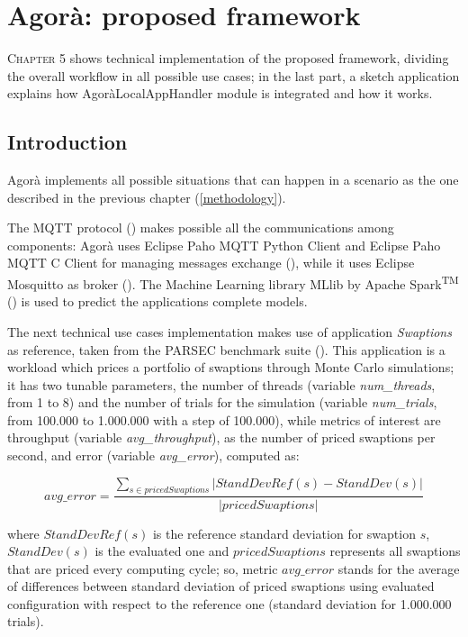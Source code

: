 \chapter{Agorà: proposed framework}\label{agora}

\lettrine{C}{hapter} 5 shows technical implementation of the proposed framework, dividing the overall workflow in all possible use cases; in the last part, a sketch application explains how AgoràLocalAppHandler module is integrated and how it works.


\section{Introduction}

Agorà implements all possible situations that can happen in a scenario as the one described in the previous chapter (\ref{methodology}).

The MQTT protocol (\cite{banks2014mqtt}) makes possible all the communications among components: Agorà uses Eclipse Paho MQTT Python Client and Eclipse Paho MQTT C Client for managing messages exchange (\cite{o2014paho}), while it uses Eclipse Mos\-quitto as broker (\cite{light2013mosquitto}). The Machine Learning library MLlib by Apache Spark\textsuperscript{TM} (\cite{spark2015apache}) is used to predict the applications complete models.

The next technical use cases implementation makes use of application \textit{Swaptions} as reference, taken from the PARSEC benchmark suite (\cite{bienia2008parsec}). This application is a workload which prices a portfolio of swaptions through Monte Carlo simulations; it has two tunable parameters, the number of threads (variable \textit{num\_threads}, from 1 to 8) and the number of trials for the simulation (variable \textit{num\_trials}, from 100.000 to 1.000.000 with a step of 100.000), while metrics of interest are throughput (variable \textit{avg\_throughput}), as the number of priced swaptions per second, and error (variable \textit{avg\_error}), computed as:

\[
avg\_error = \dfrac{\sum_{s \in pricedSwaptions} \left\vert StandDevRef(s) - StandDev(s) \right\vert}{\left\vert pricedSwaptions \right\vert}
\]

where $StandDevRef(s)$ is the reference standard deviation for swaption $s$, $StandDev(s)$ is the evaluated one and $pricedSwaptions$ represents all swaptions that are priced every computing cycle; so, metric $avg\_error$ stands for the average of differences between standard deviation of priced swaptions using evaluated configuration with respect to the reference one (standard deviation for 1.000.000 trials).

